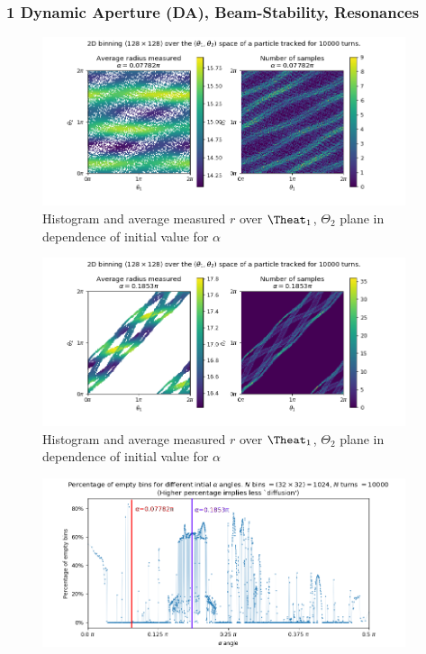 \documentclass{beamer}
\begin{document}
\begin{frame}[fragile]
\frametitle{1 Dynamic Aperture (DA), Beam-Stability, Resonances}
{
\begin{figure}
    \centering
    \includegraphics[width=0.95\textwidth]{carlo_emilio_figs/resonance_plot_01.png}
    \caption{Histogram and average measured $r$ over $\Theat_1$, $\Theta_2$ plane in dependence of initial value for $\alpha$ }
\end{figure}
}
{
\begin{figure}
    \centering
    \includegraphics[width=0.95\textwidth]{carlo_emilio_figs/resonance_plot_02.png}
    \caption{Histogram and average measured $r$ over $\Theat_1$, $\Theta_2$ plane in dependence of initial value for $\alpha$ }
\end{figure}
}
{
\begin{figure}
    \centering
    \includegraphics[width=0.95\textwidth]{carlo_emilio_figs/resonance_plot_03.png}
\end{figure}
}
\end{frame}
\end{document}
